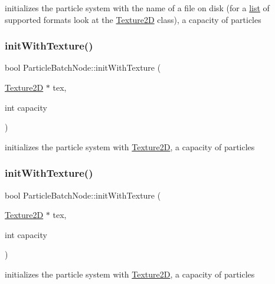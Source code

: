 initializes the particle system with the name of a file on disk (for a \hyperlink{protocollist-p}{list} of supported formats look at the \hyperlink{classTexture2D}{Texture2D} class), a capacity of particles \mbox{\label{classParticleBatchNode_a91c7160da6c6599fc1d150de43296cdc}} 
\subsubsection{\texorpdfstring{init\+With\+Texture()}{initWithTexture()}\hspace{0.1cm}{\footnotesize\ttfamily [1/2]}}
{\footnotesize\ttfamily bool Particle\+Batch\+Node\+::init\+With\+Texture (\begin{DoxyParamCaption}\item[{\hyperlink{classTexture2D}{Texture2D} $\ast$}]{tex,  }\item[{int}]{capacity }\end{DoxyParamCaption})}

initializes the particle system with \hyperlink{classTexture2D}{Texture2D}, a capacity of particles \mbox{\label{classParticleBatchNode_a91c7160da6c6599fc1d150de43296cdc}} 
\subsubsection{\texorpdfstring{init\+With\+Texture()}{initWithTexture()}\hspace{0.1cm}{\footnotesize\ttfamily [2/2]}}
{\footnotesize\ttfamily bool Particle\+Batch\+Node\+::init\+With\+Texture (\begin{DoxyParamCaption}\item[{\hyperlink{classTexture2D}{Texture2D} $\ast$}]{tex,  }\item[{int}]{capacity }\end{DoxyParamCaption})}

initializes the particle system with \hyperlink{classTexture2D}{Texture2D}, a capacity of particles \mbox{\label{classParticleBatchNode_a1d1efda71101dc032ffee3e24ee1a61e}} 
